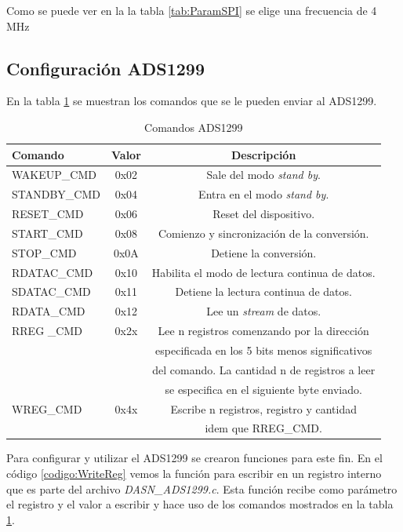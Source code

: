 Como se puede ver en la la tabla \ref{tab:ParamSPI} se elige una frecuencia de 4 MHz


\subsection{Configuración ADS1299}
En la tabla \ref{tab:ComandosADS1299} se muestran los comandos que se le pueden enviar al ADS1299.

\begin{table}[h]
\centering
\caption[Comandos ADS1299]{Comandos ADS1299}
\begin{tabular}{l c c}
\toprule
\textbf{Comando} & \textbf{Valor} & \textbf{Descripción}\\
\midrule

WAKEUP\_CMD	& 0x02 & Sale del modo \textit{stand by}.\\
STANDBY\_CMD	& 0x04 & Entra en el modo \textit{stand by}.\\
RESET\_CMD	& 0x06 & Reset del dispositivo.\\
START\_CMD 	& 0x08 & Comienzo y sincronización de la conversión.\\
STOP\_CMD 	& 0x0A & Detiene la conversión.\\
RDATAC\_CMD 	& 0x10 & Habilita el modo de lectura continua de datos.\\
SDATAC\_CMD	& 0x11 & Detiene la lectura continua de datos.\\
RDATA\_CMD 	& 0x12 & Lee un \textit{stream} de datos.\\
RREG	\_CMD	& 0x2x & Lee n registros comenzando por la dirección\\
			&      & especificada en los 5 bits menos significativos\\
			&      & del comando. La cantidad n de registros a leer \\
			&      & se especifica en el siguiente byte enviado.\\
WREG\_CMD 	& 0x4x & Escribe n registros, registro y cantidad \\
			&      & idem que RREG\_CMD.\\
\bottomrule
\hline
\end{tabular}
\label{tab:ComandosADS1299}
\end{table}

Para configurar y utilizar el ADS1299 se crearon funciones para este fin. En el código \ref{codigo:WriteReg} vemos la función para escribir en un registro interno que es parte del archivo \textit{DASN\_ADS1299.c}. Esta función recibe como parámetro el registro y el valor a escribir y hace uso de los comandos mostrados en la tabla \ref{tab:ComandosADS1299}.

